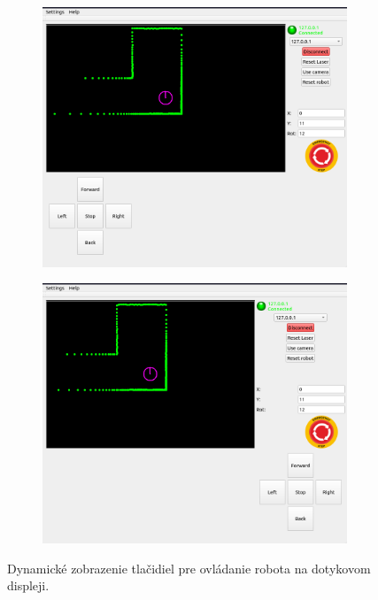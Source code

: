 \begin{figure}[!htbp]
	\begin{subfigure}{0.49\textwidth}
		\includegraphics[width=\textwidth]{img/left-hand.png}
	\end{subfigure}
	\hfill
	\begin{subfigure}{0.49\textwidth}
		\includegraphics[width=\textwidth]{img/right-hand.png}
	\end{subfigure}
	\caption{ Dynamické zobrazenie tlačidiel pre ovládanie robota na dotykovom displeji. }
	\label{fig:touch}
\end{figure}

